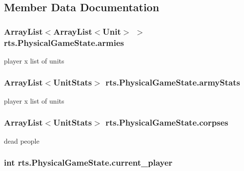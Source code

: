 \subsection{Member Data Documentation}
\hypertarget{classrts_1_1_physical_game_state_a3ac864942771e62fb0ae8f67e8b05689}{
\subsubsection[{armies}]{\setlength{\rightskip}{0pt plus 5cm}ArrayList$<$ArrayList$<${\bf Unit}$>$ $>$ {\bf rts.PhysicalGameState.armies}}}
\label{classrts_1_1_physical_game_state_a3ac864942771e62fb0ae8f67e8b05689}
player x list of units \hypertarget{classrts_1_1_physical_game_state_ad7679ca58d8e264c2564fe6f2583612c}{
\subsubsection[{armyStats}]{\setlength{\rightskip}{0pt plus 5cm}ArrayList$<$UnitStats$>$ {\bf rts.PhysicalGameState.armyStats}}}
\label{classrts_1_1_physical_game_state_ad7679ca58d8e264c2564fe6f2583612c}
player x list of units \hypertarget{classrts_1_1_physical_game_state_ad414bf7c2032a2773bb429f8293ffde8}{
\subsubsection[{corpses}]{\setlength{\rightskip}{0pt plus 5cm}ArrayList$<$UnitStats$>$ {\bf rts.PhysicalGameState.corpses}}}
\label{classrts_1_1_physical_game_state_ad414bf7c2032a2773bb429f8293ffde8}
dead people \hypertarget{classrts_1_1_physical_game_state_aba5e892341302f7278d8b6133f194c90}{
\subsubsection[{current\_\-player}]{\setlength{\rightskip}{0pt plus 5cm}int {\bf rts.PhysicalGameState.current\_\-player}}}
